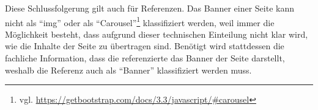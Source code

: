         Diese Schlussfolgerung gilt auch für Referenzen.
        Das Banner einer Seite kann nicht als "`img"'
        oder als "`Carousel"'\footnote{vgl. \url{https://getbootstrap.com/docs/3.3/javascript/\#carousel}}
        klassifiziert werden, weil immer die Möglichkeit besteht,
        dass aufgrund dieser technischen Einteilung nicht klar wird,
        wie die Inhalte der Seite zu übertragen sind.
        Benötigt wird stattdessen die fachliche Information,
        dass die referenzierte {\resource} das Banner der Seite darstellt,
        weshalb die Referenz auch als "`Banner"' klassifiziert werden muss.


    



    